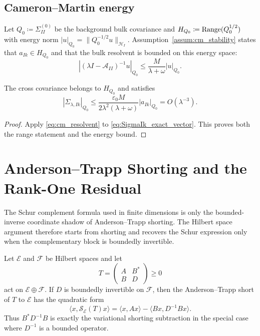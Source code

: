 \subsection{Cameron--Martin energy}

Let $Q_0\coloneqq\Sigma_{II}^{(0)}$ be the background bulk covariance and
$H_{Q_0}\coloneqq\operatorname{Range}(Q_0^{1/2})$ with energy norm
$|u|_{Q_0}=\|Q_0^{-1/2}u\|_{\mathcal{H}_I}$.  Assumption~\ref{assum:cm_stability}
states that $a_{Ik}\in H_{Q_0}$ and that the bulk resolvent is bounded on this
energy space:
\begin{equation}
  |(\lambda I-\mathcal{A}_{II})^{-1}u|_{Q_0}
  \le \frac{M}{\lambda+\omega}|u|_{Q_0}.
  \label{eq:cm_resolvent}
\end{equation}

\begin{lemma}
\label{lem:finite_energy_leakage}
The cross covariance belongs to $H_{Q_0}$ and satisfies
\begin{equation}
 |\Sigma_{\lambda,Ik}|_{Q_0}
 \le
 \frac{\varepsilon_0M}{2\lambda^2(\lambda+\omega)}
 |a_{Ik}|_{Q_0}
 =O(\lambda^{-3}).
 \label{eq:cross_energy}
\end{equation}
\end{lemma}

\begin{proof}
Apply \eqref{eq:cm_resolvent} to
\eqref{eq:SigmaIk_exact_vector}.  This proves both the range statement and the
energy bound.
\end{proof}

\section{Anderson--Trapp Shorting and the Rank-One Residual}
\label{app:shorting_residual}

The Schur complement formula used in finite dimensions is only the
bounded-inverse coordinate shadow of Anderson--Trapp shorting.  The Hilbert
space argument therefore starts from shorting and recovers the Schur expression
only when the complementary block is boundedly invertible.

\begin{lemma}
\label{lem:schur_shadow_shorting}
Let $\mathcal{E}$ and $\mathcal{F}$ be Hilbert spaces and let
\[
  T=\begin{pmatrix}A&B^*\\B&D\end{pmatrix}\ge0
\]
act on $\mathcal{E}\oplus\mathcal{F}$.  If $D$ is boundedly invertible on
$\mathcal{F}$, then the Anderson--Trapp short of $T$ to $\mathcal{E}$ has the
quadratic form
\begin{equation}
  \langle x,\mathcal{S}_{\mathcal{E}}(T)x\rangle
  =
  \langle x,Ax\rangle-\langle Bx,D^{-1}Bx\rangle.
  \label{eq:short_shadow}
\end{equation}
Thus $B^*D^{-1}B$ is exactly the variational shorting subtraction in the special
case where $D^{-1}$ is a bounded operator.
\end{lemma}

